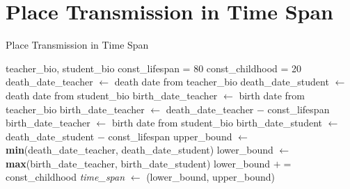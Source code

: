 \documentclass[12pt,english]{article}
\newcommand{\myindent}[1]{
\newline\makebox[#1cm]{}
}
\begin{document}
\section{Place Transmission in Time Span}
\begin{center}
\begin{minipage}{.8\linewidth}
\begin{algorithm}[H]
\caption{Place Transmission in Time Span}\label{euclid}
\begin{algorithmic}[1]
\Require teacher\_bio, student\_bio
\State const\_lifespan = 80
\State const\_childhood = 20
\State death\_date\_teacher $\gets$ death date from  teacher\_bio
\State death\_date\_student $\gets$ death date from student\_bio
    \State birth\_date\_teacher $\gets$ birth date from  teacher\_bio
\Else
    \State birth\_date\_teacher $\gets$ death\_date\_teacher \myindent{4.2} $-$  const\_lifespan
\EndIf 
{}
    \State birth\_date\_teacher $\gets$ birth date from student\_bio
\Else
    \State birth\_date\_student $\gets$ death\_date\_student \myindent{4.2} $-$ const\_lifespan
\EndIf 
\State upper\_bound $\gets$ \textbf{min}(death\_date\_teacher, death\_date\_student)
\State lower\_bound $\gets$ \textbf{max}(birth\_date\_teacher, birth\_date\_student)
{}
    \State lower\_bound $\mathrel{+}=$ const\_childhood
\EndIf 
\State \textit{time\_span} $\gets$ (lower\_bound, upper\_bound)
\end{algorithmic}
\end{algorithm}
\end{minipage}
\end{center}

\begin{figure}
   
\end{figure}
\end{document}
